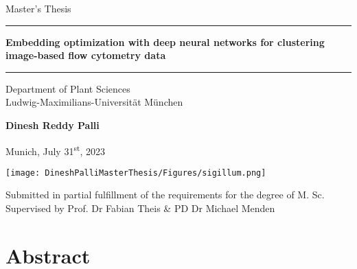 \documentclass[12pt,a4paper]{article}
\newcommand{\mytitle}{Embedding optimization with deep neural networks for clustering image-based flow cytometry data}
\newcommand{\myname}{Dinesh Reddy Palli}
\newcommand{\mysupervisor}{Prof. Dr Fabian Theis}
\newcommand{\myinternalsupervisor}{PD Dr Michael Menden}
\begin{document}
\onehalfspacing
 
\begin{titlepage}
\begin{center}
    
\LARGE
Master's Thesis
    
\vspace{0.5cm}
      
\rule{\textwidth}{1.5pt}
\LARGE
\textbf{\mytitle}
\rule{\textwidth}{1.5pt}
   
\vspace{0.5cm}
      
\large
Department of Plant Sciences \\
Ludwig-Maximilians-Universität München 

\vfill

\Large
\textbf{\myname}

\vfill

\large
Munich, July 31\textsuperscript{st}, 2023
      
\vfill

\texttt{[image: DineshPalliMasterThesis/Figures/sigillum.png]}


\vfill

\normalsize
Submitted in partial fulfillment of the requirements for the degree of M. Sc.\\

Supervised by \mysupervisor{} \& \myinternalsupervisor

\end{center}
\end{titlepage}

\newpage



\newpage

\newpage
\tableofcontents

\newpage
\listoffigures
\newpage
\listoftables

\newpage



\section{Abstract}
\label{Abstract}

\end{document}
